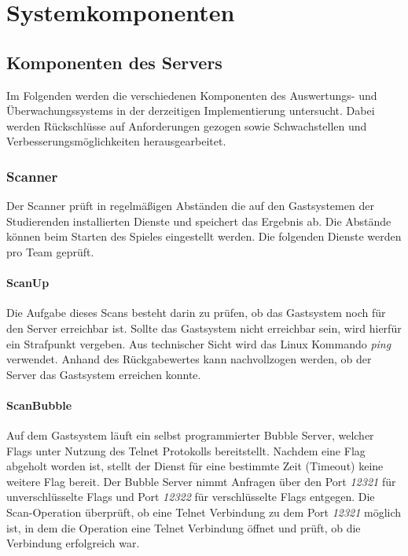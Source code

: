 \section{Systemkomponenten}\label{sec:Systemkomponenten}

\subsection{Komponenten des Servers}\label{subsec:Komponente_des_Servers}
Im Folgenden werden die verschiedenen Komponenten des Auswertungs- und Überwachungssystems in der derzeitigen Implementierung untersucht. Dabei werden Rückschlüsse auf Anforderungen gezogen sowie Schwachstellen und Verbesserungsmöglichkeiten herausgearbeitet.

\subsubsection{Scanner}\label{subsubsec:Scanner}
Der Scanner prüft in regelmäßigen Abständen die auf den Gastsystemen der Studierenden installierten Dienste und speichert das Ergebnis ab. Die Abstände können beim Starten des Spieles eingestellt werden. Die folgenden Dienste werden pro Team geprüft.

\paragraph{ScanUp}\label{para:ScanUp}
Die Aufgabe dieses Scans besteht darin zu prüfen, ob das Gastsystem noch für den Server erreichbar ist. Sollte das Gastsystem nicht erreichbar sein, wird hierfür ein Strafpunkt vergeben. Aus technischer Sicht wird das Linux Kommando \textit{ping} verwendet. Anhand des Rückgabewertes kann nachvollzogen werden, ob der Server das Gastsystem erreichen konnte.

\paragraph{ScanBubble}\label{para:ScanBubble}
Auf dem Gastsystem läuft ein selbst programmierter Bubble Server, welcher Flags unter Nutzung des Telnet Protokolls bereitstellt. Nachdem eine Flag abgeholt worden ist, stellt der Dienst für eine bestimmte Zeit (Timeout) keine weitere Flag bereit. Der Bubble Server nimmt Anfragen über den Port \textit{12321} für unverschlüsselte Flags und Port \textit{12322} für verschlüsselte Flags entgegen. Die Scan-Operation überprüft, ob eine Telnet Verbindung zu dem Port \textit{12321} möglich ist, in dem die Operation eine Telnet Verbindung öffnet und prüft, ob die Verbindung erfolgreich war.

